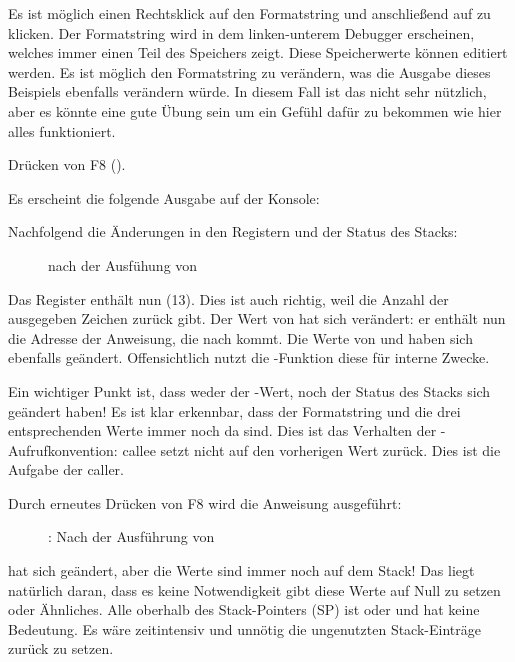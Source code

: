 Es ist möglich einen Rechtsklick auf den Formatstring und anschließend auf  zu klicken.
Der Formatstring wird in dem linken-unterem Debugger erscheinen, welches immer einen Teil des Speichers zeigt.
Diese Speicherwerte können editiert werden.
Es ist möglich den Formatstring zu verändern, was die Ausgabe dieses Beispiels ebenfalls verändern würde.
In diesem Fall ist das nicht sehr nützlich, aber es könnte eine gute Übung sein um ein Gefühl dafür zu
bekommen wie hier alles funktioniert.

\clearpage
Drücken von F8 (\stepover).

Es erscheint die folgende Ausgabe auf der Konsole:



Nachfolgend die Änderungen in den Registern und der Status des Stacks:

\begin{figure}[H]
\centering
{}
\caption{\olly nach der Ausfühung von \printf{}}
\label{fig:printf3_olly_3}
\end{figure}

Das Register \EAX enthält nun  (13).
Dies ist auch richtig, weil \printf die Anzahl der ausgegeben Zeichen zurück gibt.
Der Wert von \EIP hat sich verändert: er enthält nun die Adresse der Anweisung, die
nach  kommt.
Die Werte von \ECX und \EDX haben sich ebenfalls geändert.
Offensichtlich nutzt die \printf-Funktion diese für interne Zwecke.

Ein wichtiger Punkt ist, dass weder der \ESP-Wert, noch der Status des Stacks sich geändert haben!
Es ist klar erkennbar, dass der Formatstring und die drei entsprechenden Werte immer noch da sind.
Dies ist das Verhalten der -Aufrufkonvention: \gls{callee} setzt \ESP nicht auf den vorherigen
Wert zurück. Dies ist die Aufgabe der \gls{caller}.

\clearpage
Durch erneutes Drücken von F8 wird die Anweisung  ausgeführt:

\begin{figure}[H]
\centering
{}
\caption{\olly: Nach der Ausführung von }
\label{fig:printf3_olly_4}
\end{figure}

\ESP hat sich geändert, aber die Werte sind immer noch auf dem Stack!
Das liegt natürlich daran, dass es keine Notwendigkeit gibt diese Werte auf Null zu setzen oder Ähnliches.
Alle oberhalb des Stack-Pointers (\ac{SP}) ist  oder \IT{\garbage{}} und hat keine Bedeutung.
Es wäre zeitintensiv und unnötig die ungenutzten Stack-Einträge zurück zu setzen.


